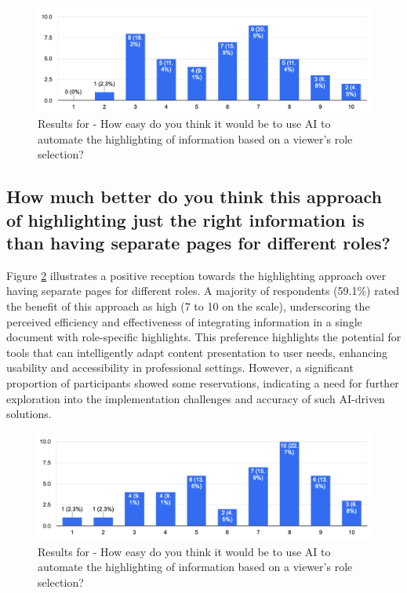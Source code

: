 \begin{figure}[h!]
\centering
\includegraphics[width=\linewidth]{Images/Survey/documents_3.png}
\caption{Results for - How easy do you think it would be to use \ac{AI} to automate the highlighting of information based on a viewer's role selection?}
\label{fig:results:highlighting:3}
\end{figure}

\pagebreak

\subsection*{How much better do you think this approach of highlighting just the right information is than having separate pages for different roles?}
Figure \ref{fig:results:highlighting:4} illustrates a positive reception towards the highlighting approach over having separate pages for different roles. A majority of respondents (59.1\%) rated the benefit of this approach as high (7 to 10 on the scale), underscoring the perceived efficiency and effectiveness of integrating information in a single document with role-specific highlights. This preference highlights the potential for tools that can intelligently adapt content presentation to user needs, enhancing usability and accessibility in professional settings. However, a significant proportion of participants showed some reservations, indicating a need for further exploration into the implementation challenges and accuracy of such \ac{AI}-driven solutions.
\begin{figure}[h!]
\centering
\includegraphics[width=\linewidth]{Images/Survey/documents_4.png}
\caption{Results for - How easy do you think it would be to use \ac{AI} to automate the highlighting of information based on a viewer's role selection?}
\label{fig:results:highlighting:4}
\end{figure}

